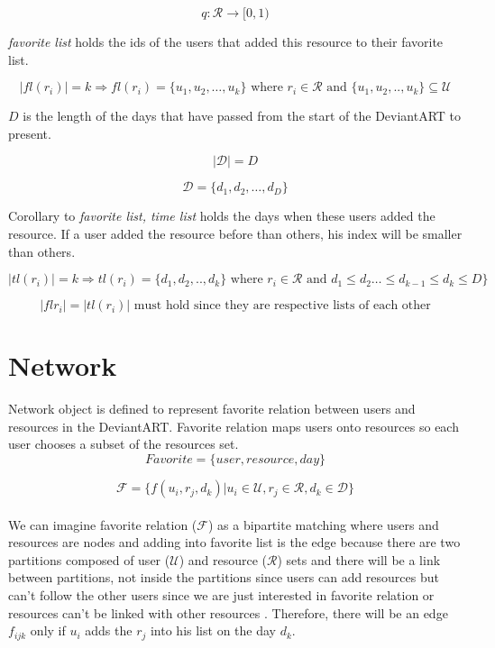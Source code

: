 \documentclass[12pt,a4paper]{report}
\begin{document}
	$$q : \mathcal{R} \to [0, 1)$$

\emph{favorite list} holds the ids of the users that added this resource to their favorite list.

	$$|fl(r_{i})| = k \Longrightarrow fl(r_{i}) =\{u_{1}, u_{2}, \dots, u_{k}\} \text{ where } r_{i} \in \mathcal{R} \text{ and } \{u_{1}, u_{2}, .., u_{k}\}  \subseteq \mathcal{U}$$ 

$D$ is the length of the days that have passed from the start of the DeviantART to present. 

	$$|\mathcal{D}| = D$$

	$$\mathcal{D} = \{d_{1}, d_{2}, \dots, d_{D}\}$$

Corollary to \emph{favorite list, time list} holds the days when these users added the resource. If a user added the resource before than others, his index will be smaller than others.

	$$|tl(r_{i})| = k \Longrightarrow tl(r_{i}) =\{d_{1}, d_{2}, .., d_{k}\} \text{ where } r_{i} \in \mathcal{R} \text{ and } d_{1} \le d_{2} \dots \le d_{k-1} \le d_{k} \le D\}$$ 

	$$|fl{r_{i}}| = |tl(r_{i})| \text{ must hold since they are respective lists of each other}$$

\clearpage

\section{Network} 

	\hspace{0.6cm}Network object is defined to represent favorite relation between users and resources in the DeviantART. Favorite relation maps users onto resources so each user chooses a subset of the resources set. \\

	$$Favorite = \{user, resource, day\}$$

	$$ \mathcal{F} = \{f(u_{i}, r_{j}, d_{k}) | u_{i} \in \mathcal{U}, r_{j} \in \mathcal{R}, d_{k} \in \mathcal{D}\}$$ \\

	We can imagine favorite relation ($\mathcal{F}$) as a bipartite matching where users and resources are nodes and adding into favorite list is the edge because there are two partitions composed of user ($\mathcal{U}$) and resource ($\mathcal{R}$) sets and there will be a link between partitions, not inside the partitions since users can add resources but can't follow the other users since we are just interested in favorite relation or resources can't be linked with other resources . Therefore, there will be an edge $f_{ijk}$ only if $u_{i}$ adds the $r_{j}$ into his list on the day $d_{k}$. \\
\end{document}
